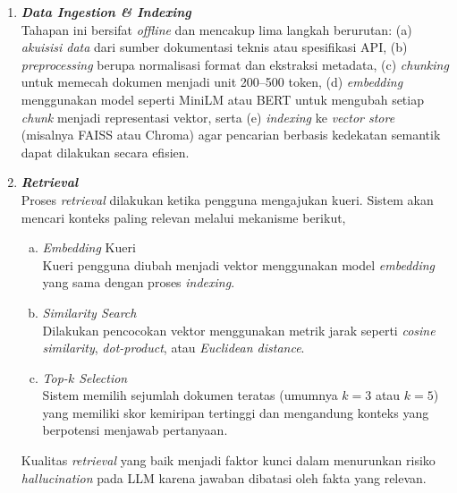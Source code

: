 \begin{enumerate}
    \item \textbf{\textit{Data Ingestion \& Indexing}}\\
    Tahapan ini bersifat \textit{offline} dan mencakup lima langkah berurutan: (a) \textit{akuisisi data} dari sumber dokumentasi teknis atau spesifikasi API, (b) \textit{preprocessing} berupa normalisasi format dan ekstraksi metadata, (c) \textit{chunking} untuk memecah dokumen menjadi unit 200--500 token, (d) \textit{embedding} menggunakan model seperti MiniLM atau BERT untuk mengubah setiap \textit{chunk} menjadi representasi vektor, serta (e) \textit{indexing} ke \textit{vector store} (misalnya FAISS atau Chroma) agar pencarian berbasis kedekatan semantik dapat dilakukan secara efisien.
    \vspace{10pt}

    \item \textbf{\textit{Retrieval}}\\
    Proses \textit{retrieval} dilakukan ketika pengguna mengajukan kueri. Sistem akan mencari konteks paling relevan melalui mekanisme berikut,
    \begin{enumerate}[a.]
        \item \textit{Embedding} Kueri \\
        Kueri pengguna diubah menjadi vektor menggunakan model \textit{embedding} yang sama dengan proses \textit{indexing}.
        \item \textit{Similarity Search} \\
        Dilakukan pencocokan vektor menggunakan metrik jarak seperti \textit{cosine similarity}, \textit{dot-product}, atau \textit{Euclidean distance}.
        \item \textit{Top-$k$ Selection} \\
        Sistem memilih sejumlah dokumen teratas (umumnya $k = 3$ atau $k = 5$) yang memiliki skor kemiripan tertinggi dan mengandung konteks yang berpotensi menjawab pertanyaan.
    \end{enumerate}
    \vspace{10pt}
    Kualitas \textit{retrieval} yang baik menjadi faktor kunci dalam menurunkan risiko \textit{hallucination} pada LLM karena jawaban dibatasi oleh fakta yang relevan.


\end{enumerate}
